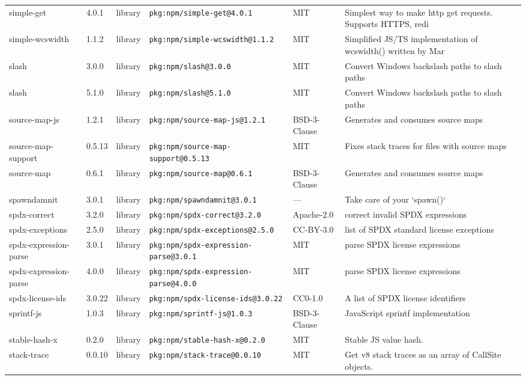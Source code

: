 \documentclass[11pt]{article}
\begin{document}
\begin{longtable}{|l|l|l|p{2.2cm}|l|p{4cm}|}
simple-get & 4.0.1 & library & \texttt{pkg:npm/simple-get@4.0.1} & MIT & Simplest way to make http get requests. Supports HTTPS, redi \\
simple-wcswidth & 1.1.2 & library & \texttt{pkg:npm/simple-wcswidth@1.1.2} & MIT & Simplified JS/TS implementation of wcswidth() written by Mar \\
slash & 3.0.0 & library & \texttt{pkg:npm/slash@3.0.0} & MIT & Convert Windows backslash paths to slash paths \\
slash & 5.1.0 & library & \texttt{pkg:npm/slash@5.1.0} & MIT & Convert Windows backslash paths to slash paths \\
source-map-js & 1.2.1 & library & \texttt{pkg:npm/source-map-js@1.2.1} & BSD-3-Clause & Generates and consumes source maps \\
source-map-support & 0.5.13 & library & \texttt{pkg:npm/source-map-support@0.5.13} & MIT & Fixes stack traces for files with source maps \\
source-map & 0.6.1 & library & \texttt{pkg:npm/source-map@0.6.1} & BSD-3-Clause & Generates and consumes source maps \\
spawndamnit & 3.0.1 & library & \texttt{pkg:npm/spawndamnit@3.0.1} & — & Take care of your `spawn()` \\
spdx-correct & 3.2.0 & library & \texttt{pkg:npm/spdx-correct@3.2.0} & Apache-2.0 & correct invalid SPDX expressions \\
spdx-exceptions & 2.5.0 & library & \texttt{pkg:npm/spdx-exceptions@2.5.0} & CC-BY-3.0 & list of SPDX standard license exceptions \\
spdx-expression-parse & 3.0.1 & library & \texttt{pkg:npm/spdx-expression-parse@3.0.1} & MIT & parse SPDX license expressions \\
spdx-expression-parse & 4.0.0 & library & \texttt{pkg:npm/spdx-expression-parse@4.0.0} & MIT & parse SPDX license expressions \\
spdx-license-ids & 3.0.22 & library & \texttt{pkg:npm/spdx-license-ids@3.0.22} & CC0-1.0 & A list of SPDX license identifiers \\
sprintf-js & 1.0.3 & library & \texttt{pkg:npm/sprintf-js@1.0.3} & BSD-3-Clause & JavaScript sprintf implementation \\
stable-hash-x & 0.2.0 & library & \texttt{pkg:npm/stable-hash-x@0.2.0} & MIT & Stable JS value hash. \\
stack-trace & 0.0.10 & library & \texttt{pkg:npm/stack-trace@0.0.10} & MIT & Get v8 stack traces as an array of CallSite objects. \\

\end{longtable}
\end{document}
